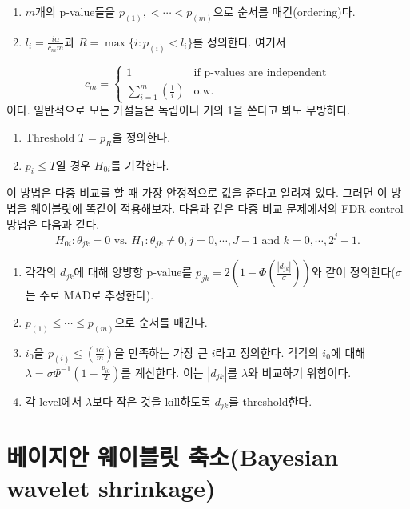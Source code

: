 \documentclass[b5paper,]{scrbook}
\theoremstyle{plain}
\theoremstyle{definition}
\numberwithin{equation}{section}
\begin{document}
\begin{enumerate}
\def\labelenumi{\arabic{enumi}.}
\item
  \(m\)개의 p-value들을 \(p_{(1)}, < \cdots < p_{(m)}\)으로 순서를
  매긴(ordering)다.
\item
  \(l_{i}=\frac{i\alpha}{c_{m}m}\)과 \(R=\max \{i: p_{(i)}< l_{i}\}\)를
  정의한다. 여기서
\end{enumerate}

\[
c_{m}=
\begin{cases}
1 & \text{if p-values are independent}\\
\sum_{i=1}^{m}(\frac{1}{i}) & \text{o.w.}
\end{cases}
\] 이다. 일반적으로 모든 가설들은 독립이니 거의 1을 쓴다고 봐도
무방하다.

\begin{enumerate}
\def\labelenumi{\arabic{enumi}.}
\setcounter{enumi}{2}
\item
  Threshold \(T=p_{R}\)을 정의한다.
\item
  \(p_{i} \leq T\)일 경우 \(H_{0i}\)를 기각한다.
\end{enumerate}

이 방법은 다중 비교를 할 때 가장 안정적으로 값을 준다고 알려져 있다.
그러면 이 방법을 웨이블릿에 똑같이 적용해보자. 다음과 같은 다중 비교
문제에서의 FDR control 방법은 다음과 같다.
\[H_{0i}:\theta_{jk}=0 \text{ vs. } H_{1}:\theta_{jk} \neq 0, j=0,\cdots, J-1 \text{ and } k=0, \cdots, 2^{j}-1.\]

\begin{enumerate}
\def\labelenumi{\arabic{enumi}.}
\item
  각각의 \(d_{jk}\)에 대해 양뱡향 p-value를
  \(p_{jk}=2(1-\Phi (\frac{| d_{jk}|}{\sigma}))\)와 같이
  정의한다(\(\sigma\)는 주로 MAD로 추정한다).
\item
  \(p_{(1)} \leq \cdots \leq p_{(m)}\)으로 순서를 매긴다.
\item
  \(i_{0}\)을 \(p_{(i)} \leq (\frac{i\alpha}{m})\)을 만족하는 가장 큰
  \(i\)라고 정의한다. 각각의 \(i_{0}\)에 대해
  \(\lambda = \sigma \Phi^{-1}(1-\frac{p_{i0}}{2})\)를 계산한다. 이는
  \(|d_{jk}|\)를 \(\lambda\)와 비교하기 위함이다.
\item
  각 level에서 \(\lambda\)보다 작은 것을 kill하도록 \(d_{jk}\)를
  threshold한다.
\end{enumerate}

\section{베이지안 웨이블릿 축소(Bayesian wavelet
shrinkage)}\label{--bayesian-wavelet-shrinkage}
\end{document}
